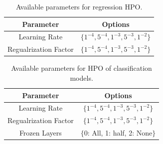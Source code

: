 \begin{table}[!ht]
    \centering
    \begin{tabular}{|c|c|}
        \hline
        \textbf{Parameter} & \textbf{Options} \\
        \hline
        Learning Rate & $\{1^{-4}, 5^{-4}, 1^{-3}, 5^{-3}, 1^{-2}\}$\\
        \hline
        Regualrization Factor & $\{1^{-4}, 5^{-4}, 1^{-3}, 5^{-3}, 1^{-2}\}$\\
        \hline
    \end{tabular}
    \caption{Available parameters for regression HPO.}
    \label{fig:reg-hp-table}
\end{table}
\begin{table}[!ht]
    \centering
    \begin{tabular}{|c|c|}
        \hline
        \textbf{Parameter} & \textbf{Options} \\
        \hline
        Learning Rate & $\{1^{-4}, 5^{-4}, 1^{-3}, 5^{-3}, 1^{-2}\}$\\
        \hline
        Regualrization Factor & $\{1^{-4}, 5^{-4}, 1^{-3}, 5^{-3}, 1^{-2}\}$\\
        \hline
        Frozen Layers & $\{$0: All, 1: half, 2: None$\}$\\
        \hline
    \end{tabular}
    \caption{Available parameters for HPO of classification models.}
    \label{fig:clf-hp-table}
\end{table}

